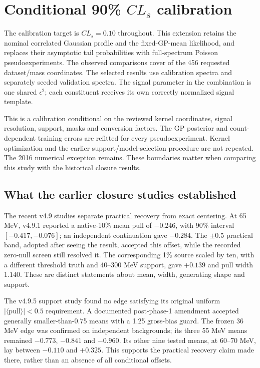 \documentclass[11pt]{article}
\begin{document}
\clearpage
\clearpage
\section{Conditional 90\% $CL_s$ calibration}\label{sec:calibration}


The calibration target is $CL_s=0.10$ throughout. This extension retains the
nominal correlated Gaussian profile and the fixed-GP-mean likelihood, and
replaces their asymptotic tail probabilities with full-spectrum Poisson
pseudoexperiments. The observed comparisons cover \CalComplete{} of the 456
requested dataset/mass coordinates. The selected results use \CalSpectra{} calibration
spectra and \ValidationSpectra{} separately seeded validation spectra.
The signal parameter in the combination is one shared $\epsilon^2$; each
constituent receives its own correctly normalized signal template.

This is a calibration conditional on the reviewed kernel coordinates, signal
resolution, support, masks and conversion factors. The GP posterior and
count-dependent training errors are refitted for every pseudoexperiment.
Kernel optimization and the earlier support/model-selection procedure are
not repeated. The 2016 numerical exception remains. These boundaries matter
when comparing this study with the historical closure results.

\subsection{What the earlier closure studies established}

The recent v4.9 studies separate practical recovery from exact centering.
At 65 MeV, v4.9.1 reported a native-10\% mean pull of $-0.246$, with 90\%
interval $[-0.417,-0.076]$; an independent continuation gave $-0.284$.
The $\pm0.5$ practical band, adopted after seeing the result, accepted this offset, while the recorded
zero-null screen still resolved it. The corresponding 1\% source scaled
by ten, with a different threshold truth and 40--300 MeV support, gave
$+0.139$ and pull width $1.140$. These are distinct statements about mean,
width, generating shape and support.

The v4.9.5 support study found no edge satisfying its original uniform
$|\langle\mathrm{pull}\rangle|<0.5$ requirement. A documented post-phase-1
amendment accepted generally smaller-than-0.75 means with a 1.25 gross-bias
guard. The frozen 36 MeV edge was confirmed on independent backgrounds;
its three 55 MeV means remained $-0.773$, $-0.841$ and $-0.960$. Its other
nine tested means, at 60--70 MeV, lay between $-0.110$ and $+0.325$.
This supports the practical recovery claim made there, rather than an
absence of all conditional offsets.
\end{document}
